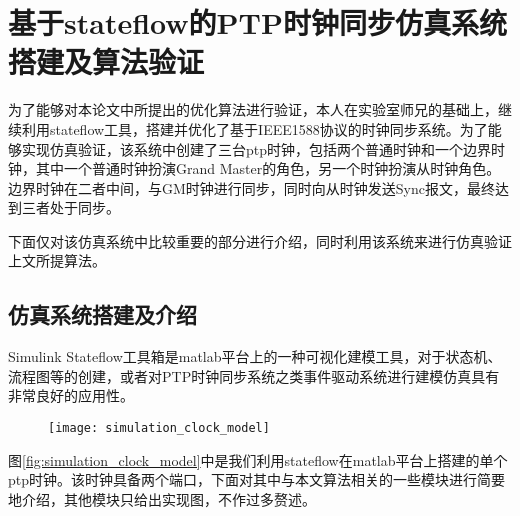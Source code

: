 
\chapter{基于stateflow的PTP时钟同步仿真系统搭建及算法验证}
为了能够对本论文中所提出的优化算法进行验证，本人在实验室师兄的基础上，继续利用stateflow工具，搭建并优化了基于IEEE1588协议的时钟同步系统。为了能够实现仿真验证，该系统中创建了三台ptp时钟，包括两个普通时钟和一个边界时钟，其中一个普通时钟扮演Grand Master的角色，另一个时钟扮演从时钟角色。边界时钟在二者中间，与GM时钟进行同步，同时向从时钟发送Sync报文，最终达到三者处于同步。

下面仅对该仿真系统中比较重要的部分进行介绍，同时利用该系统来进行仿真验证上文所提算法。

\section{仿真系统搭建及介绍}
Simulink Stateflow工具箱是matlab平台上的一种可视化建模工具，对于状态机、流程图等的创建，或者对PTP时钟同步系统之类事件驱动系统进行建模仿真具有非常良好的应用性。

\begin{figure}[!hbp]
  \centering
  \begin{minipage}[b]{1\textwidth}
    \captionstyle{\centering}
    \centering
    \texttt{[image: simulation\_clock\_model]}
  \end{minipage}     
\end{figure}

图\ref{fig:simulation_clock_model}中是我们利用stateflow在matlab平台上搭建的单个ptp时钟。该时钟具备两个端口，下面对其中与本文算法相关的一些模块进行简要地介绍，其他模块只给出实现图，不作过多赘述。

